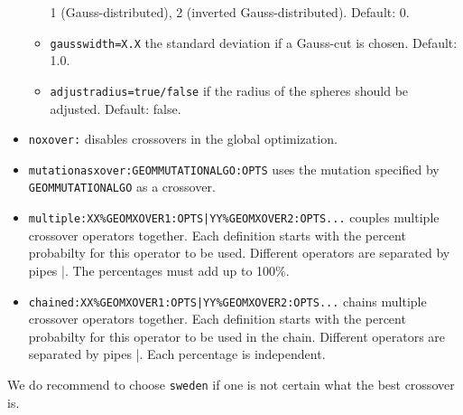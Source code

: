 \documentclass[a4paper,10pt]{scrbook}
\begin{document}
\begin{itemize}
\begin{itemize}
1 (Gauss-distributed), 2 (inverted Gauss-distributed). Default: 0.
    \item \texttt{gausswidth=X.X} the standard deviation if a Gauss-cut is 
chosen. Default: 1.0.
    \item \texttt{adjustradius=true/false} if the radius of the spheres should 
be adjusted. Default: false.
  \end{itemize}
  \item \texttt{noxover:} disables crossovers in the global optimization.
  \item \texttt{mutationasxover:GEOMMUTATIONALGO:OPTS} uses the mutation 
specified by \texttt{GEOMMUTATIONALGO} as a crossover.
  \item \texttt{multiple:XX\%GEOMXOVER1:OPTS|YY\%GEOMXOVER2:OPTS...} couples 
multiple crossover operators together. Each definition starts with the percent 
probabilty for this operator to be used. Different operators are separated by 
pipes |. The percentages must add up to 100\%.
  \item \texttt{chained:XX\%GEOMXOVER1:OPTS|YY\%GEOMXOVER2:OPTS...} chains 
multiple crossover operators together. Each definition starts with the percent 
probabilty for this operator to be used in the chain. Different operators are 
separated by pipes |. Each percentage is independent.
\end{itemize}

We do recommend to choose \texttt{sweden} if one is not certain what the best
crossover is.
\end{document}
